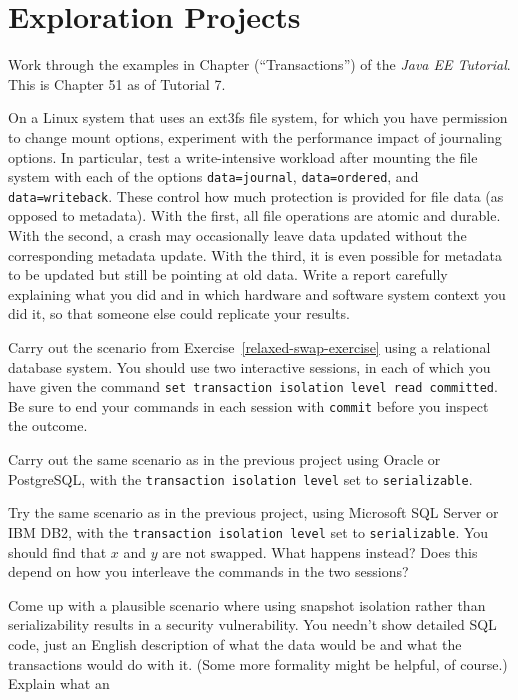 \section*{Exploration Projects}
\begin{chapterEnumerate}
\item
Work through the examples in Chapter (``Transactions'') of the
\textit{Java EE Tutorial}. This is Chapter 51 as of Tutorial 7.
\item
On a Linux system that uses an ext3fs file system, for which you have
permission to change mount options, experiment with the performance
impact of journaling options.  In particular, test a write-intensive
workload after mounting the file system with each of the options
\verb|data=journal|, \verb|data=ordered|, and
\verb|data=writeback|.  These control how much protection is
provided for file data (as opposed to metadata).  With the first, all
file operations are atomic and durable.  With the second, a crash may
occasionally leave data updated without the corresponding metadata
update.  With the third, it is even possible for metadata to be
updated but still be pointing at old data.  
Write a report 
carefully explaining what you did and in which hardware and software
system context you did it, so that someone else could replicate
your results.
\item
Carry out the scenario from Exercise~\ref{relaxed-swap-exercise} using a relational
database system.  You should use two interactive sessions, in each of
which you have given the command {\tt set transaction isolation level
read committed}.  Be sure to end your commands in each session with
{\tt commit} before  you inspect the outcome.
\item
Carry out the same scenario as in the previous project using Oracle
or PostgreSQL, with the {\tt transaction isolation level} set to
{\tt serializable}.
\item
Try the same scenario as in the previous project, using Microsoft SQL
Server or IBM DB2, with the {\tt transaction isolation level} set to
{\tt serializable}.  You should find that $x$ and $y$ are not swapped.  What
happens instead?  Does this depend on how you interleave the commands
in the two sessions?
\item
Come up with a plausible scenario where using snapshot isolation
rather than serializability results in a security vulnerability.  You
needn't show detailed SQL code, just an English description of what
the data would be and what the transactions would do with it.  (Some
more formality might be helpful, of course.)  Explain what an

\end{chapterEnumerate}
